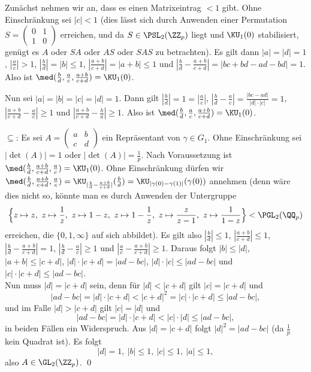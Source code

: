 Zunächst nehmen wir an, dass es einen Matrixeintrag $<1$ gibt.
Ohne Einschränkung sei $|c|<1$ (dies lässt sich durch Anwenden einer
Permutation $S=\begin{pmatrix}
0 & 1 \\
1 & 0
\end{pmatrix}$
erreichen, und da $S\in\PSL_2(\ZZ_p)$ liegt und $\KU_1(0)$ 
stabilisiert, genügt es $A$ oder $SA$ oder $AS$ oder $SAS$ zu
betrachten).
Es gilt dann $|a|=|d|=1$, $|\frac{a}{c}|>1$,
$|\frac{b}{d}|=|b|\leq 1$, $|\frac{a+b}{c+d}|=|a+b|\leq 1$ und
$|\frac{b}{d}-\frac{a+b}{c+d}|=|bc+bd-ad-bd|=1$.
Also ist $\med(\frac{b}{d},\frac{a}{c},\frac{a+b}{c+d})=\KU_1(0)$.

Nun sei $|a|=|b|=|c|=|d|=1$.
Dann gilt $|\frac{b}{d}|=1=|\frac{a}{c}|$,
$|\frac{b}{d}-\frac{a}{c}|=\frac{|bc-ad|}{|d|\cdot|c|}=1$,
$|\frac{a+b}{c+d}-\frac{a}{c}|\geq 1$ und
$|\frac{a+b}{c+d}-\frac{b}{a}|\geq 1$. Also ist
$\med(\frac{b}{d},\frac{a}{c},\frac{a+b}{c+d})=\KU_1(0)$.

\glqq$\subseteq$\grqq:
Es sei $A=\begin{pmatrix}
a & b \\
c & d
\end{pmatrix}$ ein Repräsentant von $\gamma\in G_1$.
Ohne Einschränkung sei $|\det(A)|=1$ oder $|\det(A)|=\frac{1}{p}$.
Nach Voraussetzung ist
$\med(\frac{b}{d},\frac{a+b}{c+d},\frac{a}{c})=\KU_1(0)$.
Ohne Einschränkung dürfen wir
$\med(\frac{b}{d},\frac{a+b}{c+d},\frac{a}{c})
=\KU_{|\frac{b}{d}-\frac{a+b}{c+d}|}(\frac{b}{d})
=\KU_{|\gamma(0)-\gamma(1)|}(\gamma(0))$ annehmen
(denn wäre dies nicht so, könnte man es durch Anwenden der Untergruppe
\[
\Bigl\{z\mapsto z,\ z\mapsto\frac{1}{z},\
 z\mapsto 1-z,\ z\mapsto 1-\frac{1}{z},\
 z\mapsto \frac{z}{z-1},\ z\mapsto\frac{1}{1-z}
 \Bigr\}
 < \PGL_2(\QQ_p)
\]
erreichen, die $\{0,1,\infty\}$ auf sich abbildet).
Es gilt also $|\frac{b}{d}|\leq 1$, $|\frac{a+b}{c+d}|\leq 1$,
$|\frac{b}{d}-\frac{a+b}{c+d}|=1$, $|\frac{b}{d}-\frac{a}{c}|\geq 1$
und $|\frac{a}{c}-\frac{a+b}{c+d}|\geq 1$.
Daraus folgt
$|b|\leq |d|$, $|a+b|\leq|c+d|$, $|d|\cdot|c+d|=|ad-bc|$,
$|d|\cdot|c|\leq|ad-bc|$ und $|c|\cdot|c+d|\leq|ad-bc|$.\\
Nun muss $|d|=|c+d|$ sein, denn für $|d|<|c+d|$ gilt $|c|=|c+d|$
und
\[
|ad-bc|=|d|\cdot|c+d|<|c+d|^2=|c|\cdot|c+d|\leq|ad-bc|,
\]
und im Falle $|d|>|c+d|$ gilt $|c|=|d|$ und
\[
|ad-bc|=|d|\cdot|c+d|<|c|\cdot|d|\leq|ad-bc|,
\]
in beiden Fällen ein Widerspruch.
Aus $|d|=|c+d|$ folgt $|d|^2=|ad-bc|$ (da $\frac{1}{p}$ kein Quadrat 
ist). Es folgt
\[
|d|=1,\ |b|\leq 1,\ |c|\leq 1,\ |a|\leq 1,
\]
also $A\in\GL_2(\ZZ_p)$.
\qed


